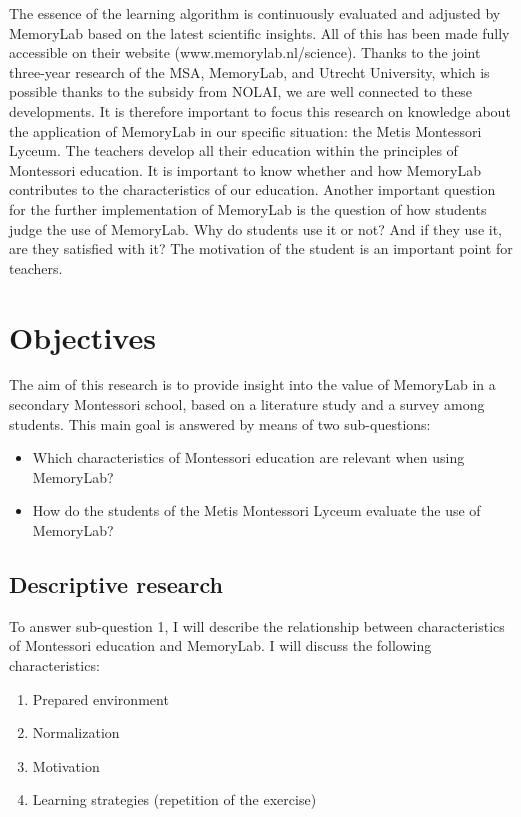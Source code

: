 \documentclass[12pt, a4paper]{article}
\begin{document}
The essence of the learning algorithm is continuously evaluated and adjusted by MemoryLab based on the latest scientific insights. All of this has been made fully accessible on their website (www.memorylab.nl/science). Thanks to the joint three-year research of the MSA, MemoryLab, and Utrecht University, which is possible thanks to the subsidy from NOLAI, we are well connected to these developments. It is therefore important to focus this research on knowledge about the application of MemoryLab in our specific situation: the Metis Montessori Lyceum. The teachers develop all their education within the principles of Montessori education. It is important to know whether and how MemoryLab contributes to the characteristics of our education. Another important question for the further implementation of MemoryLab is the question of how students judge the use of MemoryLab. Why do students use it or not? And if they use it, are they satisfied with it? The motivation of the student is an important point for teachers. 
\newpage 

\section{Objectives} The aim of this research is to provide insight into the value of MemoryLab in a secondary Montessori school, based on a literature study and a survey among students. This main goal is answered by means of two sub-questions: 
\begin{itemize} 
    \item Which characteristics of Montessori education are relevant when using MemoryLab? 
    \item How do the students of the Metis Montessori Lyceum evaluate the use of MemoryLab? 
\end{itemize}

\subsection{Descriptive research} To answer sub-question 1, I will describe the relationship between characteristics of Montessori education and MemoryLab. I will discuss the following characteristics:
\begin{enumerate}
    \item Prepared environment
    \item Normalization
    \item Motivation
    \item Learning strategies (repetition of the exercise)
\end{enumerate}
\end{document}

